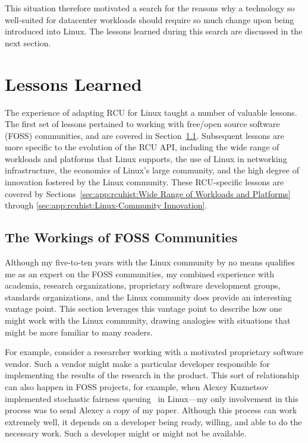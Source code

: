 This situation therefore motivated a search for the reasons why a
technology so well-suited for datacenter workloads should require
so much change upon being introduced into Linux.
The lessons learned during this search are discussed in the next section.

\section{Lessons Learned}
\label{sec:app:rcuhist:Lessons Learned}

The experience of adapting RCU for Linux taught a number of valuable
lessons.
The first set of lessons pertained to working with
free/open source software (FOSS) communities, and
are covered in Section~\ref{sec:app:rcuhist:The Workings of FOSS Communities}.
Subsequent lessons are more specific to the evolution of the
RCU API, including
the wide range of workloads and platforms that Linux supports,
the use of Linux in networking infrastructure,
the economics of Linux's large community,
and the high degree of innovation fostered by the Linux community.
These RCU-specific lessons are covered by
Sections~\ref{sec:app:rcuhist:Wide Range of Workloads and Platforms} through
\ref{sec:app:rcuhist:Linux-Community Innovation}.

\subsection{The Workings of FOSS Communities}
\label{sec:app:rcuhist:The Workings of FOSS Communities}

Although my five-to-ten years with the Linux community by no means qualifies me
as an expert on the FOSS communities,
my combined experience with academia, research organizations,
proprietary software development groups, standards organizations,
and the Linux community does provide an interesting vantage point.
This section leverages this vantage point to describe how one might work
with the Linux community, drawing analogies with
situations that might be more familiar to many readers.

For example, consider a researcher working with a motivated
proprietary software vendor.
Such a vendor might make a particular developer responsible for
implementing the results of the research in the product.
This sort of relationship can also happen in FOSS projects,
for example, when Alexey Kuznetsov implemented stochastic fairness
queuing~\cite{McKenney90} in Linux---my only involvement in this
process was to send Alexey a copy of my paper.
Although this process can work extremely well, it depends on a developer
being ready, willing, and able to do the necessary work.
Such a developer might or might not be available.

